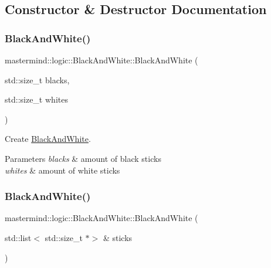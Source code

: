 \subsection{Constructor \& Destructor Documentation}
\hypertarget{classmastermind_1_1logic_1_1_black_and_white_a4dbd770b9f1ba3bef45ebba9fc01dcf4}{}\label{classmastermind_1_1logic_1_1_black_and_white_a4dbd770b9f1ba3bef45ebba9fc01dcf4} 
\subsubsection{\texorpdfstring{Black\+And\+White()}{BlackAndWhite()}\hspace{0.1cm}{\footnotesize\ttfamily [1/2]}}
{\footnotesize\ttfamily mastermind\+::logic\+::\+Black\+And\+White\+::\+Black\+And\+White (\begin{DoxyParamCaption}\item[{std\+::size\+\_\+t}]{blacks,  }\item[{std\+::size\+\_\+t}]{whites }\end{DoxyParamCaption})}



Create \hyperlink{classmastermind_1_1logic_1_1_black_and_white}{Black\+And\+White}. 


\begin{DoxyParams}{Parameters}
{\em blacks} & amount of black sticks \\
\hline
{\em whites} & amount of white sticks \\
\hline
\end{DoxyParams}
\hypertarget{classmastermind_1_1logic_1_1_black_and_white_a4ddf35a30c296bb2453cffc833ea20e8}{}\label{classmastermind_1_1logic_1_1_black_and_white_a4ddf35a30c296bb2453cffc833ea20e8} 
\subsubsection{\texorpdfstring{Black\+And\+White()}{BlackAndWhite()}\hspace{0.1cm}{\footnotesize\ttfamily [2/2]}}
{\footnotesize\ttfamily mastermind\+::logic\+::\+Black\+And\+White\+::\+Black\+And\+White (\begin{DoxyParamCaption}\item[{std\+::list$<$ std\+::size\+\_\+t $\ast$$>$ \&}]{sticks }\end{DoxyParamCaption})}



